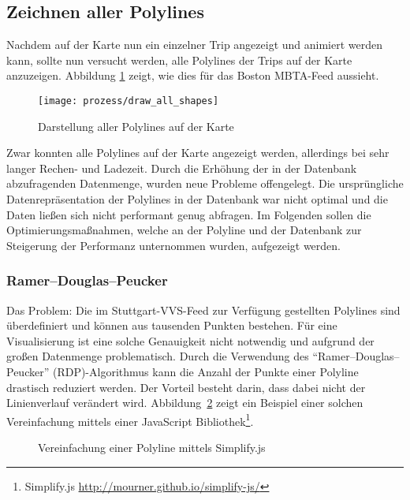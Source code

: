 \subsection{Zeichnen aller Polylines}
\label{sub:zeichnen_aller_polylines}
  Nachdem auf der Karte nun ein einzelner Trip angezeigt und animiert werden kann, sollte nun versucht werden, alle Polylines der Trips auf der Karte anzuzeigen. Abbildung \ref{fig:prozess/draw_all_shapes} zeigt, wie dies für das Boston MBTA-Feed aussieht.

  \begin{figure}[htbp]
    \begin{center}
      \texttt{[image: prozess/draw\_all\_shapes]}
      \caption{Darstellung aller Polylines auf der Karte}
      \label{fig:prozess/draw_all_shapes}
    \end{center}
  \end{figure}
  
  Zwar konnten alle Polylines auf der Karte angezeigt werden, allerdings bei sehr langer Rechen- und Ladezeit. Durch die Erhöhung der in der Datenbank abzufragenden Datenmenge, wurden neue Probleme offengelegt. Die ursprüngliche Datenrepräsentation der Polylines in der Datenbank war nicht optimal und die Daten ließen sich nicht performant genug abfragen. Im Folgenden sollen die Optimierungsmaßnahmen, welche an der Polyline und der Datenbank zur Steigerung der Performanz unternommen wurden, aufgezeigt werden.

  \subsubsection{Ramer–Douglas–Peucker}
  \label{ssub:ramer_douglas_peucker}
    Das Problem: Die im Stuttgart-VVS-Feed zur Verfügung gestellten Polylines sind überdefiniert und können aus tausenden Punkten bestehen. Für eine Visualisierung ist eine solche Genauigkeit nicht notwendig und aufgrund der großen Datenmenge problematisch. Durch die Verwendung des "`Ramer–Douglas–Peucker"' (RDP)-Algorithmus kann die Anzahl der Punkte einer Polyline drastisch reduziert werden. Der Vorteil besteht darin, dass dabei nicht der Linienverlauf verändert wird. Abbildung~\ref{fig:simplify} zeigt ein Beispiel einer solchen Vereinfachung mittels einer JavaScript Bibliothek\footnote{Simplify.js \url{http://mourner.github.io/simplify-js/}}.

    \begin{figure}[htbp]
      \centering
      \hfill
      \caption{Vereinfachung einer Polyline mittels Simplify.js}
      \label{fig:simplify}
    \end{figure}

